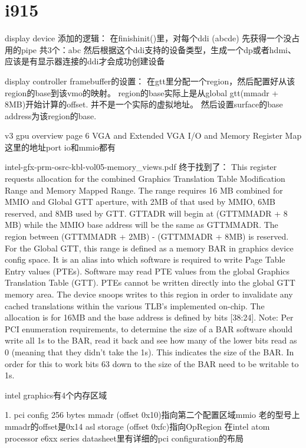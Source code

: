 \section{i915}
display device 添加的逻辑：
在finishinit()里，对每个ddi (abcde)
  先获得一个没占用的pipe 共3个：abc
  然后根据这个ddi支持的设备类型，生成一个dp或者hdmi、
  应该是有显示器连接的ddi才会成功创建设备



display controller framebuffer的设置：
在gtt里分配一个region，然后配置好从该region的base到该vmo的映射。
region的base实际上是从global gtt(mmadr + 8MB)开始计算的offset. 并不是一个实际的虚拟地址。
然后设置surface的base address为该region的base.


v3 gpu overview page 6 VGA and Extended VGA I/O and Memory Register Map
这里的地址port io和mmio都有


intel-gfx-prm-osrc-kbl-vol05-memory_views.pdf
终于找到了：
This register requests allocation for the combined Graphics Translation Table Modification Range and Memory
Mapped Range. The range requires 16 MB combined for MMIO and Global GTT aperture, with 2MB of that used
by MMIO, 6MB reserved, and 8MB used by GTT. GTTADR will begin at (GTTMMADR + 8 MB) while the MMIO
base address will be the same as GTTMMADR. The region between (GTTMMADR + 2MB) - (GTTMMADR + 8MB)
is reserved. For the Global GTT, this range is defined as a memory BAR in graphics device config space. It is an
alias into which software is required to write Page Table Entry values (PTEs). Software may read PTE values from
the global Graphics Translation Table (GTT). PTEs cannot be written directly into the global GTT memory area.
The device snoops writes to this region in order to invalidate any cached translations within the various TLB's
implemented on-chip. The allocation is for 16MB and the base address is defined by bits [38:24]. Note: Per PCI
enumeration requirements, to determine the size of a BAR software should write all 1s to the BAR, read it back
and see how many of the lower bits read as 0 (meaning that they didn't take the 1s). This indicates the size of the
BAR. In order for this to work bits 63 down to the size of the BAR need to be writable to 1s.


intel graphics有4个内存区域

1. pci config 256 bytes
   mmadr (offset 0x10)指向第二个配置区域mmio  老的型号上mmadr的offset是0x14
   asl storage (offset 0xfc)指向OpRegion
   在intel atom processor e6xx series datasheet里有详细的pci configuration的布局


